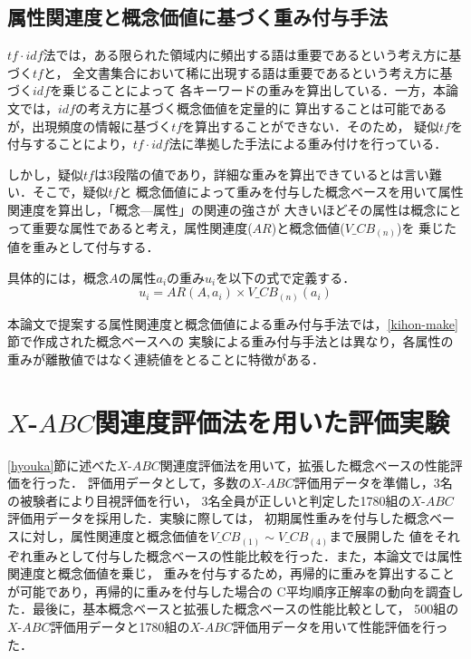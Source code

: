 \documentclass[japanese]{jnlp_1.3e}
\begin{document}
\subsection{属性関連度と概念価値に基づく重み付与手法} \label{shin-omomi}

$\mathit{tf}\cdot\mathit{idf}$法では，ある限られた領域内に頻出する語は重要であるという考え方に基づく$\mathit{tf}$と，
全文書集合において稀に出現する語は重要であるという考え方に基づく$\mathit{idf}$を乗じることによって
各キーワードの重みを算出している．一方，本論文では，$\mathit{idf}$の考え方に基づく概念価値を定量的に
算出することは可能であるが，出現頻度の情報に基づく$\mathit{tf}$を算出することができない．そのため，
疑似$\mathit{tf}$を付与することにより，$\mathit{tf}\cdot\mathit{idf}$法に準拠した手法による重み付けを行っている．

しかし，疑似$\mathit{tf}$は3段階の値であり，詳細な重みを算出できているとは言い難い．そこで，疑似$\mathit{tf}$と
概念価値によって重みを付与した概念ベースを用いて属性関連度を算出し，「概念—属性」の関連の強さが
大きいほどその属性は概念にとって重要な属性であると考え，属性関連度($\mathit{AR}$)と概念価値($V\_\mathit{CB}_{(n)}$)を
乗じた値を重みとして付与する．

具体的には，概念$A$の属性$a_i$の重み$u_i$を以下の式で定義する．
\begin{equation}
 u_i=\mathit{AR}(A,a_i)\times V\_\mathit{CB}_{(n)}(a_i)
\end{equation}

本論文で提案する属性関連度と概念価値による重み付与手法では，\ref{kihon-make}節で作成された概念ベースへの
実験による重み付与手法とは異なり，各属性の重みが離散値ではなく連続値をとることに特徴がある．



\section{$X$-$\mathit{ABC}$関連度評価法を用いた評価実験}

\ref{hyouka}節に述べた$X$-$\mathit{ABC}$関連度評価法を用いて，拡張した概念ベースの性能評価を行った．
評価用データとして，多数の$X$-$\mathit{ABC}$評価用データを準備し，3名の被験者により目視評価を行い，
3名全員が正しいと判定した1780組の$X$-$\mathit{ABC}$評価用データを採用した．実験に際しては，
初期属性重みを付与した概念ベースに対し，属性関連度と概念価値を$V\_\mathit{CB}_{(1)}\sim V\_\mathit{CB}_{(4)}$まで展開した
値をそれぞれ重みとして付与した概念ベースの性能比較を行った．また，本論文では属性関連度と概念価値を乗じ，
重みを付与するため，再帰的に重みを算出することが可能であり，再帰的に重みを付与した場合の
C平均順序正解率の動向を調査した．最後に，基本概念ベースと拡張した概念ベースの性能比較として，
500組の$X$-$\mathit{ABC}$評価用データと1780組の$X$-$\mathit{ABC}$評価用データを用いて性能評価を行った．
\end{document}
